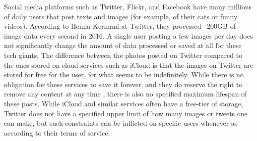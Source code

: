 Social media platforms such as Twitter, Flickr, and Facebook have many millions of daily users that post texts and images (for example, of their cats or funny videos). According to Henna Kermani at Twitter, they processed ~200GB of image data every second in 2016\cite{MobileScaleLondona}. A single user posting a few images per day does not significantly change the amount of data processed or saved at all for these tech giants.%
The difference between the photos posted on Twitter compared to the ones stored on cloud services such as iCloud is that the images on Twitter are stored for free for the user, for what seems to be indefinitely. While there is no obligation for these services to save it forever, and they do reserve the right to remove any content at any time %
, there is also no specified maximum lifespan of these posts. While iCloud and similar services often have a free-tier of storage, Twitter does not have a specified upper limit of how many images or tweets one can make, but such constraints can be inflicted on specific users whenever as according to their terms of service.